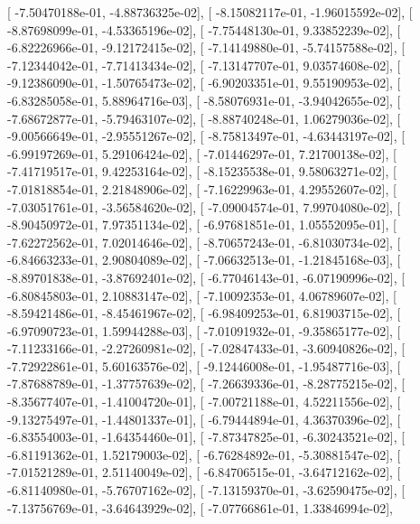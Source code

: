 \documentclass{article}
\begin{document}
       [ -7.50470188e-01,  -4.88736325e-02],
       [ -8.15082117e-01,  -1.96015592e-02],
       [ -8.87698099e-01,  -4.53365196e-02],
       [ -7.75448130e-01,   9.33852239e-02],
       [ -6.82226966e-01,  -9.12172415e-02],
       [ -7.14149880e-01,  -5.74157588e-02],
       [ -7.12344042e-01,  -7.71413434e-02],
       [ -7.13147707e-01,   9.03574608e-02],
       [ -9.12386090e-01,  -1.50765473e-02],
       [ -6.90203351e-01,   9.55190953e-02],
       [ -6.83285058e-01,   5.88964716e-03],
       [ -8.58076931e-01,  -3.94042655e-02],
       [ -7.68672877e-01,  -5.79463107e-02],
       [ -8.88740248e-01,   1.06279036e-02],
       [ -9.00566649e-01,  -2.95551267e-02],
       [ -8.75813497e-01,  -4.63443197e-02],
       [ -6.99197269e-01,   5.29106424e-02],
       [ -7.01446297e-01,   7.21700138e-02],
       [ -7.41719517e-01,   9.42253164e-02],
       [ -8.15235538e-01,   9.58063271e-02],
       [ -7.01818854e-01,   2.21848906e-02],
       [ -7.16229963e-01,   4.29552607e-02],
       [ -7.03051761e-01,  -3.56584620e-02],
       [ -7.09004574e-01,   7.99704080e-02],
       [ -8.90450972e-01,   7.97351134e-02],
       [ -6.97681851e-01,   1.05552095e-01],
       [ -7.62272562e-01,   7.02014646e-02],
       [ -8.70657243e-01,  -6.81030734e-02],
       [ -6.84663233e-01,   2.90804089e-02],
       [ -7.06632513e-01,  -1.21845168e-03],
       [ -8.89701838e-01,  -3.87692401e-02],
       [ -6.77046143e-01,  -6.07190996e-02],
       [ -6.80845803e-01,   2.10883147e-02],
       [ -7.10092353e-01,   4.06789607e-02],
       [ -8.59421486e-01,  -8.45461967e-02],
       [ -6.98409253e-01,   6.81903715e-02],
       [ -6.97090723e-01,   1.59944288e-03],
       [ -7.01091932e-01,  -9.35865177e-02],
       [ -7.11233166e-01,  -2.27260981e-02],
       [ -7.02847433e-01,  -3.60940826e-02],
       [ -7.72922861e-01,   5.60163576e-02],
       [ -9.12446008e-01,  -1.95487716e-03],
       [ -7.87688789e-01,  -1.37757639e-02],
       [ -7.26639336e-01,  -8.28775215e-02],
       [ -8.35677407e-01,  -1.41004720e-01],
       [ -7.00721188e-01,   4.52211556e-02],
       [ -9.13275497e-01,  -1.44801337e-01],
       [ -6.79444894e-01,   4.36370396e-02],
       [ -6.83554003e-01,  -1.64354460e-01],
       [ -7.87347825e-01,  -6.30243521e-02],
       [ -6.81191362e-01,   1.52179003e-02],
       [ -6.76284892e-01,  -5.30881547e-02],
       [ -7.01521289e-01,   2.51140049e-02],
       [ -6.84706515e-01,  -3.64712162e-02],
       [ -6.81140980e-01,  -5.76707162e-02],
       [ -7.13159370e-01,  -3.62590475e-02],
       [ -7.13756769e-01,  -3.64643929e-02],
       [ -7.07766861e-01,   1.33846994e-02],
\end{document}
